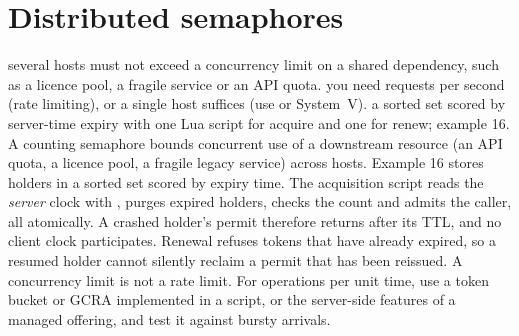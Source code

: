 \section{Distributed semaphores}
{several hosts must not exceed a concurrency limit on a shared dependency, such as a licence pool, a fragile service or an API quota.}
{you need requests per second (rate limiting), or a single host suffices (use  or System~V).}
{a sorted set scored by server-time expiry with one Lua script for acquire and one for renew; example 16.}
A counting semaphore bounds concurrent use of a downstream resource (an API quota, a licence pool, a fragile legacy service) across hosts. Example 16 stores holders in a sorted set scored by expiry time. The acquisition script reads the \emph{server} clock with , purges expired holders, checks the count and admits the caller, all atomically. A crashed holder's permit therefore returns after its TTL, and no client clock participates. Renewal refuses tokens that have already expired, so a resumed holder cannot silently reclaim a permit that has been reissued.
A concurrency limit is not a rate limit. For operations per unit time, use a token bucket or GCRA implemented in a script, or the server-side features of a managed offering, and test it against bursty arrivals.

